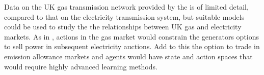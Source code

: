 Data on the UK gas transmission network provided by the  is
of limited detail, compared to that on the electricity transmission system,
but suitable models could be used to study the the relationships
between UK gas and electricity markets.  As in , actions in
the gas market would constrain the generators options to sell power in subsequent
electricity auctions.  Add to this the option to trade in emission allowance
markets and agents would have state and action spaces that would require
highly advanced learning methods.

%
%


